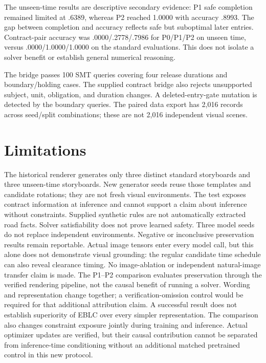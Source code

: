 \documentclass[11pt]{article}
\begin{document}
The unseen-time results are descriptive secondary evidence: P1 safe completion
remained limited at .6389, whereas P2 reached 1.0000 with accuracy .8993. The
gap between completion and accuracy reflects safe but suboptimal later entries.
Contract-pair accuracy was .0000/.2778/.7986 for P0/P1/P2 on unseen time, versus
.0000/1.0000/1.0000 on the standard evaluations. This does not isolate a solver
benefit or establish general numerical reasoning.

The bridge passes 100 SMT queries covering
four release durations and boundary/holding cases. The supplied contract bridge also rejects unsupported subject, unit, obligation,
and duration changes. A deleted-entry-gate mutation is detected by the boundary
queries. The paired data export has
2,016 records across seed/split combinations; these are not 2,016 independent
visual scenes.
\section{Limitations}
The historical renderer generates only three distinct standard storyboards and
three unseen-time storyboards. New generator seeds reuse those templates and
candidate rotations; they are not fresh visual environments. The test exposes
contract information at inference and cannot support a claim about inference
without constraints. Supplied synthetic rules are not automatically extracted
road facts. Solver satisfiability does not prove learned safety. Three model
seeds do not replace independent environments. Negative or inconclusive
preservation results remain reportable.
Actual image tensors enter every model call, but this alone does not demonstrate
visual grounding: the regular candidate time schedule can also reveal clearance
timing. No image-ablation or independent natural-image transfer claim is made.
The P1--P2 comparison evaluates preservation through the verified rendering
pipeline, not the causal benefit of running a solver. Wording and representation
change together; a verification-omission control would be required for that
additional attribution claim. A successful result does not establish superiority
of EBLC over every simpler representation.
The comparison also changes constraint exposure jointly during training and
inference. Actual optimizer updates are verified, but their causal contribution
cannot be separated from inference-time conditioning without an additional
matched pretrained control in this new protocol.
\end{document}
